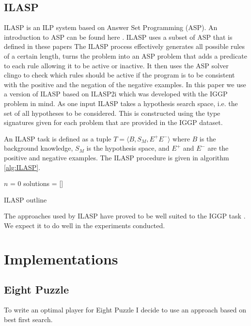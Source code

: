 \documentclass[a4paper,10pt]{report}
\begin{document}
\section{ILASP}

ILASP is an ILP system based on Answer Set Programming (ASP). An introduction to ASP can be found here \cite{Corapi/ASP}. ILASP uses a subset of ASP that is defined in these papers\cite{ILASP-Manuel}\cite{MarkLaw/OG-ILASP}\cite{MarkLaw/Thesis} The ILASP process effectively generates all possible rules of a certain length, turns the problem into an ASP problem that adds a predicate to each rule allowing it to be active or inactive. It then uses the ASP solver clingo\cite{Clingo}  to check which rules should be active if the program is to be consistent with the positive and the negation of the negative examples\cite{MarkLaw/OG-ILASP}\cite{MarkLaw/Thesis}. In this paper we use a version of ILASP based on ILASP2i\cite{MarkLaw/ILASP2i} which was developed with the IGGP problem in mind\cite{Cropper/IGGP}. As one input ILASP takes a hypothesis search space, i.e. the set of all hypotheses to be considered. This is constructed using the type signatures given for each problem that are provided in the IGGP dataset.

An ILASP task is defined as a tuple $T = \langle B,S_M,E^+E^-\rangle$ where $B$ is the background knowledge, $S_M$ is the hypothesis space, and $E^+$ and $E^-$ are the positive and negative examples. The ILASP procedure is given in algorithm \ref{alg:ILASP}. 
\begin{algorithm}[H]\label{alg:ILASP}
	\SetAlgoLined
	$n$ = 0\;
	solutions = []\;
	\caption{ILASP outline}
\end{algorithm}

The approaches used by ILASP have proved to be well suited to the IGGP task \cite{Cropper/IGGP}. We expect it to do well in the experiments conducted.
\chapter{Implementations}
\section{Eight Puzzle}
To write an optimal player for Eight Puzzle I decide to use an approach based on best first search.
\end{document}
